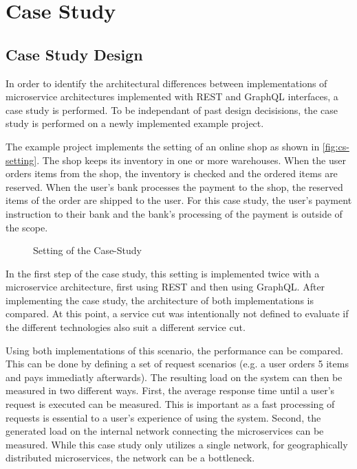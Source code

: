 \section{Case Study}\label{sec:case-study}

\subsection{Case Study Design}

In order to identify the architectural differences between implementations of microservice architectures implemented with REST and GraphQL interfaces, a case study is performed.
To be independant of past design decisisions, the case study is performed on a newly implemented example project.

The example project implements the setting of an online shop as shown in \autoref{fig:cs-setting}.
The shop keeps its inventory in one or more warehouses.
When the user orders items from the shop, the inventory is checked and the ordered items are reserved.
When the user's bank processes the payment to the shop, the reserved items of the order are shipped to the user.
For this case study, the user's payment instruction to their bank and the bank's processing of the payment is outside of the scope.

\begin{figure}[!htb]
    \centering
    
    \caption{Setting of the Case-Study}
    \label{fig:cs-setting}
\end{figure}

In the first step of the case study, this setting is implemented twice with a microservice architecture, first using \ac{REST} and then using GraphQL.
After implementing the case study, the architecture of both implementations is compared.
At this point, a service cut was intentionally not defined to evaluate if the different technologies also suit a different service cut.

Using both implementations of this scenario, the performance can be compared.
This can be done by defining a set of request scenarios (e.g. a user orders 5 items and pays immediatly afterwards).
The resulting load on the system can then be measured in two different ways.
First, the average response time until a user's request is executed can be measured.
This is important as a fast processing of requests is essential to a user's experience of using the system.
Second, the generated load on the internal network connecting the microservices can be measured.
While this case study only utilizes a single network, for geographically distributed microservices, the network can be a bottleneck.

